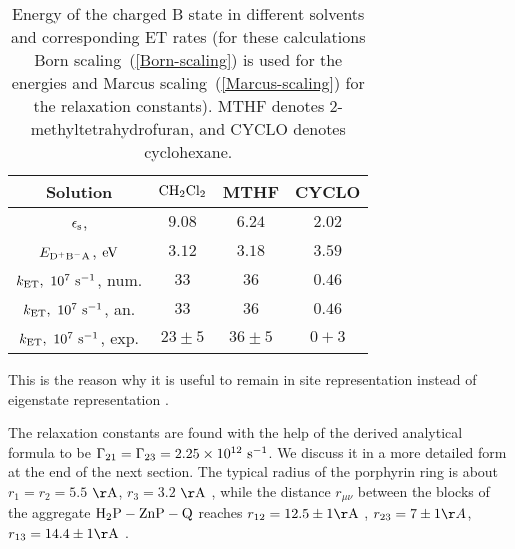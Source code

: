 \documentclass[12pt,twoside,a4paper]{report}
\begin{document}
\begin{table}[!h] 
  \begin{center} 
    \caption[Energy of the  charged B state in 
      different solvents and corresponding ET rates]
     {\small Energy of the  charged B state in 
      different solvents and corresponding ET rates 
      (for these calculations Born scaling~(\ref{Born-scaling}) 
      is used for the energies and 
      Marcus scaling~(\ref{Marcus-scaling}) for
      the relaxation constants). 
      MTHF denotes 2-methyltetrahydrofuran, and
      CYCLO denotes cyclohexane.}
\begin{tabular}{cccc} 
Solution                                          &  ${\rm CH_2Cl_2}$              & MTHF                          & CYCLO  \\ \hline 
$\epsilon_{\rm s}$,  \cite{r16}                   &  $9.08      $                  & $6.24    $                    & $2.02$ \\ 
$E_{\rm D^+B^-A}$, $ {\rm eV}$                    &  $3.12      $                  & $3.18    $                    & $3.59$ \\   
$  k_{\rm ET},~10^7~{\rm s}^{-1}$, num.           &  $33       $                  & $36      $                    & $0.46$ \\  
$  k_{\rm ET},~10^7~{\rm s}^{-1}$, an.            &  $33       $                  & $36      $                    & $0.46$ \\ 
$  k_{\rm ET},~10^7~{\rm s}^{-1}$, exp. \cite{r4} &  $23 \pm 5 $                  & $36 \pm 5$                    & $0+3 $ \\  
     \end{tabular} 
    \label{tab:2} 
  \end{center} 
\end{table} 

This is the reason why it is useful to remain in 
site representation instead of eigenstate representation \cite{davi98}. 

The relaxation constants are found with the help of the derived 
analytical formula 
to be  
%
$\Gamma_{21}=\Gamma_{23}=2.25 \times 10^{12}  ~{\rm s}^{-1}$. We discuss it 
in a more detailed form at the end of the next section.
The typical radius of the porphyrin  ring  is about 
$r_1=r_2=5.5$ ${\rm \AA{}}$, 
$r_3=3.2$ ${\rm \AA{}}$
\cite{z4}, 
while the distance $r_{\mu{}\nu}$ between
the blocks of the 
aggregate ${\rm H_2P-ZnP-Q}$ reaches 
$ r_{12}=12.5 \pm{}1 {\rm \AA}$ \cite{r4,z4}, 
$r_{23}=7\pm{}1\AA{}$, $r_{13}=14.4 \pm{}1 {\rm \AA}$ \cite{fuch96d,r4}.
\end{document}
